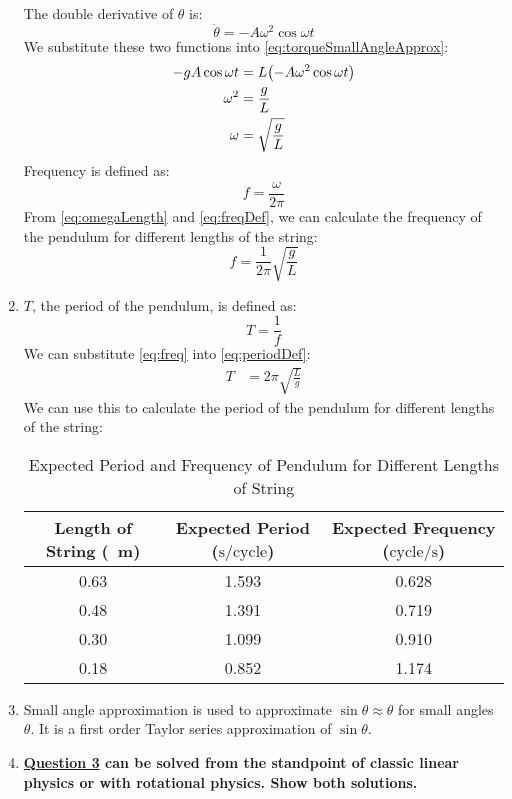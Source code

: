\documentclass[article, 12pt]{article}
\DeclarePairedDelimiter\paren{(}{)} %
\begin{document}
\begin{enumerate}[1)]
    The double derivative of $\theta$ is:
    \begin{equation}        \label{eq:ddotTheta}
        \ddot{\theta} = -A\omega^2\cos{\omega t}
    \end{equation}
    We substitute these two functions into \autoref{eq:torqueSmallAngleApprox}:
    \begin{align}        
        -gA\cos{\omega t} &= L\paren*{-A\omega^2\cos{\omega t}} \nonumber \\
        \omega^2 &= \frac{g}{L} \nonumber \\
        \omega &= \sqrt{\frac{g}{L}}
        \label{eq:omegaLength}
    \end{align}
    Frequency is defined as:
    \begin{equation}
        f = \frac{\omega}{2\pi}
        \label{eq:freqDef}
    \end{equation}
    From \autoref{eq:omegaLength} and \autoref{eq:freqDef}, we can calculate the frequency of the pendulum for different lengths of the string:
    \begin{equation}
        f = \frac{1}{2\pi}\sqrt{\frac{g}{L}}
        \label{eq:freq}
    \end{equation}
    \item     
    $T$, the period of the pendulum, is defined as:
    \begin{equation}
        T = \frac{1}{f}
        \label{eq:periodDef}
    \end{equation}
    We can substitute \autoref{eq:freq} into \autoref{eq:periodDef}:
    \begin{align}        \label{eq:period}
        T &= 2\pi \sqrt{\frac{L}{g}}
    \end{align}
    We can use this to calculate the period of the pendulum for different lengths of the string:
    \begin{table}[H]       
        \centering
        \begin{tabular}{|c|c|c|}
            \hline
            \textbf{Length of String} (\SI{}{\meter}) & \textbf{Expected Period} ($\text{s}/\text{cycle}$) & \textbf{Expected Frequency} ($\text{cycle}/\text{s}$) \\
            \hline
            0.63 & 1.593 & 0.628 \\
            0.48 & 1.391 & 0.719 \\
            0.30 & 1.099 & 0.910 \\
            0.18 & 0.852 & 1.174 \\
            \hline
        \end{tabular}
        \caption{Expected Period and Frequency of Pendulum for Different Lengths of String}
        \label{tab:expectedPeriodFreq}
    \end{table}
    \item Small angle approximation is used to approximate $\sin{\theta} \approx \theta$ for small angles $\theta$. It is a first order Taylor series approximation of $\sin{\theta}$. \label{q:smallAngleApprox}
    \item \textbf{\hyperref[q:diffRotation]{Question 3} can be solved from the standpoint of classic linear physics or with rotational physics.  Show both solutions.}
    

\end{enumerate}
\end{document}
